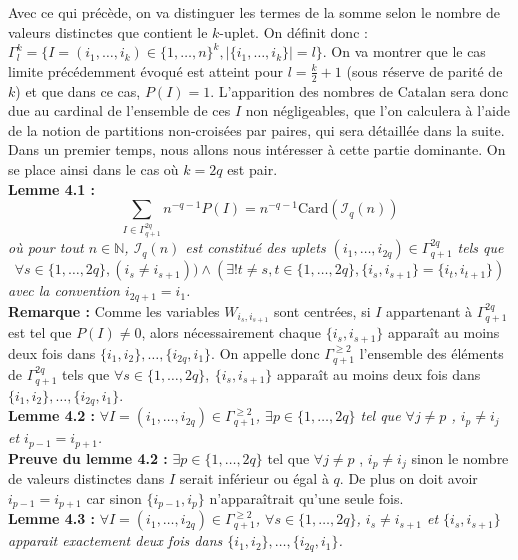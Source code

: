 \documentclass[10pt,a4paper]{article}
\begin{document}
Avec ce qui précède, on va distinguer les termes de la somme selon le nombre de valeurs distinctes que contient le $k$-uplet. On définit donc : $ \Gamma^k_l = \{I=(i_1,\dots,i_k) \in \{1,\dots,n\}^k, |\{i_1,\dots,i_k\}|=l \} $. On va montrer que le cas limite précédemment évoqué est atteint pour $l=\frac{k}{2} + 1$ (sous réserve de parité de $k$) et que dans ce cas, $P(I)=1$. L'apparition des nombres de Catalan sera donc due au cardinal de l'ensemble de ces $I$ non négligeables, que l'on calculera à l'aide de la notion de partitions non-croisées par paires, qui sera détaillée dans la suite.\\
Dans un premier temps, nous allons nous intéresser à cette partie dominante. On se place ainsi dans le cas où $k=2q$ est pair. \\
\textbf{Lemme 4.1 :} \textit{ 
\[\sum_{I \in \Gamma^{2q}_{q+1} } n^{-q-1}P(I) = n^{-q-1}\text{Card}(\mathcal{I}_q(n)) \] 
où pour tout $n \in \mathbb{N}$, $\mathcal{I}_q(n)$ est constitué des uplets $(i_1,\dots,i_{2q}) \in \Gamma^{2q}_{q+1}$ tels que
\[ \forall s \in \{1,\dots,2q\}, (i_s \neq i_{s+1})) \land (\exists! t \neq s, t \in \{1,\dots,2q\}, \{i_s, i_{s+1}\}=\{i_t, i_{t+1}\})\]
avec la convention $i_{2q+1}=i_1$. }\\

\textbf{Remarque :} Comme les variables $W_{i_s,i_{s+1}}$ sont centrées, si $I$ appartenant à $\Gamma^{2q}_{q+1}$ est tel que $P(I) \neq 0$, alors nécessairement chaque $\{ i_s,i_{s+1} \}$ apparaît au moins deux fois dans  $\{ i_1,i_2 \},\dots,\{ i_{2q},i_1 \}$. On appelle donc $\Gamma^{\geq 2}_{q+1}$ l'ensemble des éléments de $\Gamma^{2q}_{q+1}$ tels que $\forall s \in \{1,\dots,2q\},\ \{ i_s,i_{s+1} \}$ apparaît au moins deux fois dans  $\{ i_1,i_2 \},\dots,\{ i_{2q},i_1 \}$. 
\\


\textbf{Lemme 4.2 :}\textit{ $\forall I=(i_1,\dots,i_{2q})\in \Gamma^{\geq 2}_{q+1}$, $\exists p \in \{1,\dots,2q\}$ tel que $\forall j \neq p$ , $i_p \neq i_j $ et $i_{p-1}=i_{p+1}$. }\\

\textbf{Preuve du lemme 4.2 :} $\exists p \in \{1,\dots,2q\}$ tel que $\forall j \neq p$ , $i_p \neq i_j $	sinon le nombre de valeurs distinctes dans $I$ serait inférieur ou égal à $q$. De plus on doit avoir $i_{p-1}=i_{p+1}$ car sinon $\{ i_{p-1},i_p \}$ n'apparaîtrait qu'une seule fois.\\

\textbf{Lemme 4.3 :}  \textit{$\forall I=(i_1,\dots,i_{2q})\in \Gamma^{\geq 2}_{q+1}$, $\forall s \in \{1,\dots,2q\}$, $i_s \neq i_{s+1}$ et $\{ i_{s},i_{s+1} \}$ apparait exactement deux fois dans $\{ i_1,i_2 \},\dots,\{ i_{2q},i_1 \}$. }\\
\end{document}
